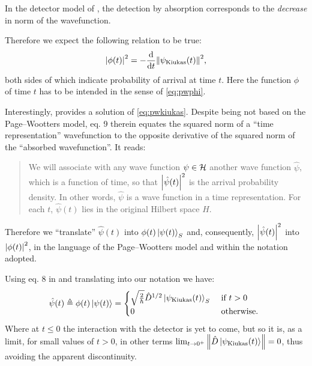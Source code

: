 In the detector model of \cite{RuschhauptAbsorption}, the detection
by absorption
corresponds to the \emph{decrease} in norm of the wavefunction.

Therefore we expect the following relation to be true:
\begin{equation}\label{eq:pwkiukas}
  \abs{\phi(t)}^2 = -\dv{t}\norm{\psi_{\text{Kiukas}}(t)}^2 \text{,}
\end{equation}
both sides of which indicate probability of arrival at time $t$.
Here the function $\phi$ of time $t$ has to be intended in the sense of
\eqref{eq:pwphi}.

Interestingly, \cite{RuschhauptAbsorption} provides a solution of \eqref{eq:pwkiukas}.
Despite being not based on the Page--Wootters model, eq. 9 therein
equates the squared norm of a ``time representation'' wavefunction
to the opposite derivative of the squared norm of the ``absorbed wavefunction''.
It reads:
\begin{quote}
  We will associate with any wave function $\psi \in \mathcal{H}$
  another wave function $\hat{\psi}$,
  which is a function of time, so that
  $\abs{\hat{\psi}(t)}^2$
  is the arrival probability density. In other words,
  $\hat{\psi}$ is a wave function in a time representation. For each
  $t$, $\hat{\psi}(t)$ lies in the original Hilbert space $H$.
\end{quote}
Therefore we ``translate'' $\hat{\psi}(t)$ into $\phi(t)\ket{\psi(t)}_S$
and, consequently, $\abs{\hat{\psi}(t)}^2$ into $\abs{\phi(t)}^2$,
in the language of the Page--Wootters model and within the notation
adopted.

Using eq. 8 in \cite{RuschhauptAbsorption} and translating into our notation we have:
\begin{equation}\label{eq:phi_psi_kiukas}
  \hat{\psi}(t) \triangleq
  \phi(t)\ket{\psi(t)} =
  \begin{cases}
    \sqrt{\frac{2}{\hbar}} \hat{D}^{1/2} \ket{\psi_{\text{Kiukas}}(t)}_S &\text{ if } t > 0 \\
    0 &\text{ otherwise. }
  \end{cases}
\end{equation}
Where at $t \le 0$ the interaction with the detector is yet to come,
but so it is, as a limit, for small values of $t>0$,
in other terms
$\lim_{t \to 0^{+}} \norm{\hat{D} \ket{\psi_{\text{Kiukas}}(t)}} = 0$, thus avoiding the apparent discontinuity.



